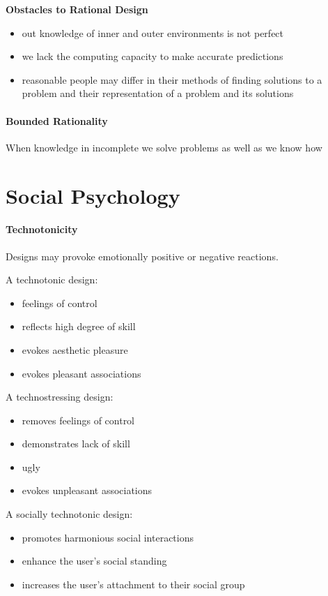 \documentclass{article}
\begin{document}
\textbf{Obstacles to Rational Design}
\begin{itemize}
	\item out knowledge of inner and outer environments is not perfect
	\item we lack the computing capacity to make accurate predictions
	\item reasonable people may differ in their methods of finding solutions to a problem and their representation of a problem and its solutions
\end{itemize}

\paragraph{Bounded Rationality}
\label{par:bounded_rationality}
When knowledge in incomplete we solve problems as well as we know how

\section*{Social Psychology}
\label{sec:social_psychology}
\paragraph{Technotonicity}
\label{par:technotonicity}
Designs may provoke emotionally positive or negative reactions.

A technotonic design:
\begin{itemize}
	\item feelings of control
	\item reflects high degree of skill
	\item evokes aesthetic pleasure
	\item evokes pleasant associations
\end{itemize}

A technostressing design:
\begin{itemize}
	\item removes feelings of control
	\item demonstrates lack of skill
	\item ugly
	\item evokes unpleasant associations
\end{itemize}

A socially technotonic design:
\begin{itemize}
	\item promotes harmonious social interactions
	\item enhance the user's social standing
	\item increases the user's attachment to their social group
\end{itemize}
\end{document}

